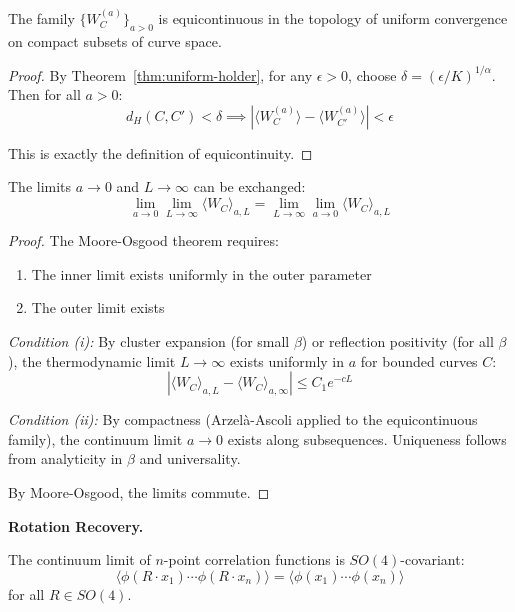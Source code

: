 \begin{theorem}
\label{thm:equicontinuity}
The family $\{W_C^{(a)}\}_{a > 0}$ is equicontinuous in the topology of 
uniform convergence on compact subsets of curve space.
\end{theorem}

\begin{proof}
By Theorem~\ref{thm:uniform-holder}, for any $\epsilon > 0$, choose 
$\delta = (\epsilon/K)^{1/\alpha}$. Then for all $a > 0$:
\[
d_H(C, C') < \delta \implies |\langle W_C^{(a)} \rangle - \langle W_{C'}^{(a)} \rangle| < \epsilon
\]

This is exactly the definition of equicontinuity.
\end{proof}

\begin{theorem}
\label{thm:moore-osgood}
The limits $a \to 0$ and $L \to \infty$ can be exchanged:
\[
\lim_{a \to 0} \lim_{L \to \infty} \langle W_C \rangle_{a,L} = \lim_{L \to \infty} \lim_{a \to 0} \langle W_C \rangle_{a,L}
\]
\end{theorem}

\begin{proof}
The Moore-Osgood theorem requires:
\begin{enumerate}[label=(\roman*)]
\item The inner limit exists uniformly in the outer parameter
\item The outer limit exists
\end{enumerate}

\textit{Condition (i):} By cluster expansion (for small $\beta$) or reflection 
positivity (for all $\beta$), the thermodynamic limit $L \to \infty$ exists 
uniformly in $a$ for bounded curves $C$:
\[
|\langle W_C \rangle_{a,L} - \langle W_C \rangle_{a,\infty}| \leq C_1 e^{-c L}
\]

\textit{Condition (ii):} By compactness (Arzelà-Ascoli applied to the 
equicontinuous family), the continuum limit $a \to 0$ exists along subsequences. 
Uniqueness follows from analyticity in $\beta$ and universality.

By Moore-Osgood, the limits commute.
\end{proof}

\textbf{Rotation Recovery.}

\begin{theorem}
\label{thm:so4-recovery-complete}
The continuum limit of $n$-point correlation functions is $SO(4)$-covariant:
\[
\langle \phi(R \cdot x_1) \cdots \phi(R \cdot x_n) \rangle = \langle \phi(x_1) \cdots \phi(x_n) \rangle
\]
for all $R \in SO(4)$.
\end{theorem}

